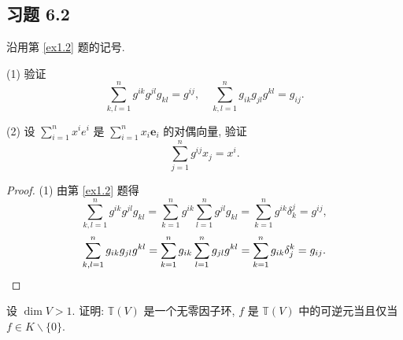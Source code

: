 \documentclass{ctexart}
\begin{document}
\subsection{习题 6.2}
\begin{exercise}%
    沿用第 \ref{ex1.2} 题的记号.

    (1) 验证
    \[\sum\limits_{k,l=1}^ng^{ik}g^{jl}g_{kl}=g^{ij},\quad\sum\limits_{k,l=1}^ng_{ik}g_{jl}g^{kl}=g_{ij}.\]

    (2) 设 $\sum\limits_{i=1}^nx^ie^i$ 是 $\sum\limits_{i=1}^nx_i\boldsymbol{e}_i$ 的对偶向量, 验证
    \[\sum\limits_{j=1}^ng^{ij}x_j=x^i.\]
\end{exercise}
\begin{proof}
    (1) 由第 \ref{ex1.2} 题得
    \[\sum\limits_{k,l=1}^ng^{ik}g^{jl}g_{kl}=\sum\limits_{k=1}^ng^{ik}\sum\limits_{l=1}^ng^{jl}g_{kl}=\sum\limits_{k=1}^ng^{ik}\delta^j_k=g^{ij},\]
    \[\sum\limits_{k,l=1}^ng_{ik}g_{jl}g^{kl}=\sum\limits_{k=1}^ng_{ik}\sum\limits_{l=1}^ng_{jl}g^{kl}=\sum\limits_{k=1}^ng_{ik}\delta_j^k=g_{ij}.\qedhere\]
\end{proof}
\begin{exercise}\label{ex2.2}
    设 $\dim V>1$. 证明: $\mathbb{T}(V)$ 是一个无零因子环, $f$ 是 $\mathbb{T}(V)$ 中的可逆元当且仅当 $f\in K\backslash\{0\}$.
\end{exercise}
\end{document}
